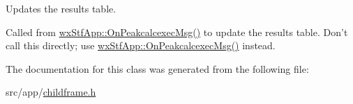 Updates the results table. 

Called from \hyperlink{classwxStfApp_a584396d82492d98d08c74689a1adfbc3}{wxStfApp::OnPeakcalcexecMsg()} to update the results table. Don't call this directly; use \hyperlink{classwxStfApp_a584396d82492d98d08c74689a1adfbc3}{wxStfApp::OnPeakcalcexecMsg()} instead. 

The documentation for this class was generated from the following file:\begin{DoxyCompactItemize}
\item 
src/app/\hyperlink{childframe_8h}{childframe.h}\end{DoxyCompactItemize}
